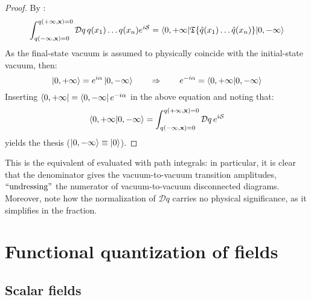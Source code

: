 \begin{proofbox}
  \begin{proof}
    By :
    \begin{equation*}
      \int_{q(-\infty,\mathbf{x}) = 0}^{q(+\infty,\mathbf{x}) = 0} \mathcal{D}q\, q(x_1) \dots q(x_n) e^{i\mathcal{S}} = \braket{0,+\infty | \mathfrak{T}\{\hat{q}(x_1) \dots \hat{q}(x_n)\} | 0,-\infty}
    \end{equation*}
    As the final-state vacuum is assumed to physically coincide with the initial-state vacuum, then:
    \begin{equation*}
      \ket{0,+\infty} = e^{i\alpha} \ket{0,-\infty}
      \qquad \Rightarrow \qquad
      e^{-i\alpha} = \braket{0,+\infty | 0,-\infty}
    \end{equation*}
    Inserting $ \bra{0,+\infty} = \bra{0,-\infty} e^{-i\alpha} $ in the above equation and noting that:
    \begin{equation}
      \braket{0,+\infty | 0,-\infty} = \int_{q(-\infty,\mathbf{x}) = 0}^{q(+\infty,\mathbf{x}) = 0} \mathcal{D}q\, e^{i\mathcal{S}}
      \label{eq:vac-to-vac}
    \end{equation}
  yields the thesis ($ \ket{0,-\infty} \equiv \ket{0} $).
  \end{proof}
\end{proofbox}

This is the equivalent of  evaluated with path integrals: in particular, it is clear that the denominator  gives the vacuum-to-vacuum transition amplitudes, $ ``\text{undressing}" $ the numerator of vacuum-to-vacuum disconnected diagrams. Moreover, note how the normalization of $ \mathcal{D}q $ carries no physical significance, as it simplifies in the fraction.

\section{Functional quantization of fields}

\subsection{Scalar fields}


